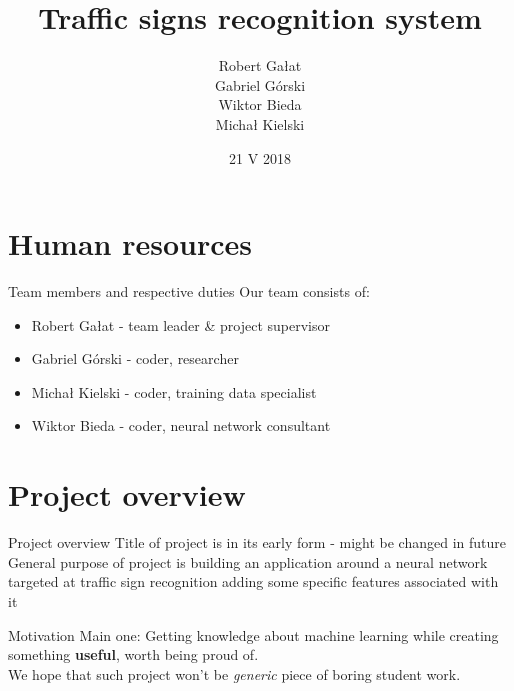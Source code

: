  \usepackage{adjustbox}

\title{Traffic signs recognition system} \author{Robert Gałat\\Gabriel
  Górski\\Wiktor Bieda\\Michał Kielski} \date{21 V 2018} 


\maketitle
\part{Human resources}
\begin{frame}{Team members and respective duties}
  Our team consists of:
  \begin{itemize}
  \item Robert Gałat - team leader \& project supervisor
  \item Gabriel Górski - coder, researcher
  \item Michał Kielski - coder, training data specialist
  \item Wiktor Bieda - coder, neural network consultant
  \end{itemize}
\end{frame}
\part{Project overview}
\begin{frame}{Project overview}
  Title of project is in its early form - might be changed in future\\

  General purpose of project is building an application around a neural network
  targeted at traffic sign recognition adding some specific features associated
  with it
\end{frame}
\begin{frame}{Motivation}
  Main one: Getting knowledge about machine learning while creating something
  \textbf{useful}, worth being proud of.\\

  We hope that such project won't be \textit{generic} piece of boring student
  work.
\end{frame}
